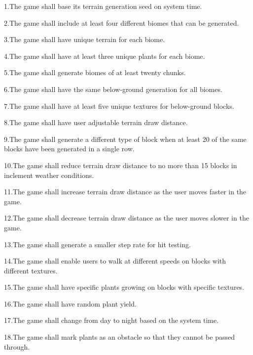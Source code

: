 \label{Requirements_R1}%
\hypertarget{Requirements_R1}{}%
1.\+The game shall base its terrain generation seed on system time.

\label{Requirements_R2}%
\hypertarget{Requirements_R2}{}%
2.\+The game shall include at least four different biomes that can be generated.

\label{Requirements_R3}%
\hypertarget{Requirements_R3}{}%
3.\+The game shall have unique terrain for each biome.

\label{Requirements_R4}%
\hypertarget{Requirements_R4}{}%
4.\+The game shall have at least three unique plants for each biome.

\label{Requirements_R5}%
\hypertarget{Requirements_R5}{}%
5.\+The game shall generate biomes of at least twenty chunks.

\label{Requirements_R6}%
\hypertarget{Requirements_R6}{}%
6.\+The game shall have the same below-\/ground generation for all biomes.

\label{Requirements_R7}%
\hypertarget{Requirements_R7}{}%
7.\+The game shall have at least five unique textures for below-\/ground blocks.

\label{Requirements_R8}%
\hypertarget{Requirements_R8}{}%
8.\+The game shall have user adjustable terrain draw distance.

\label{Requirements_R9}%
\hypertarget{Requirements_R9}{}%
9.\+The game shall generate a different type of block when at least 20 of the same blocks have been generated in a single row.

\label{Requirements_R10}%
\hypertarget{Requirements_R10}{}%
10.\+The game shall reduce terrain draw distance to no more than 15 blocks in inclement weather conditions.

\label{Requirements_R11}%
\hypertarget{Requirements_R11}{}%
11.\+The game shall increase terrain draw distance as the user moves faster in the game.

\label{Requirements_R12}%
\hypertarget{Requirements_R12}{}%
12.\+The game shall decrease terrain draw distance as the user moves slower in the game.

\label{Requirements_R13}%
\hypertarget{Requirements_R13}{}%
13.\+The game shall generate a smaller step rate for hit testing.

\label{Requirements_R14}%
\hypertarget{Requirements_R14}{}%
14.\+The game shall enable users to walk at different speeds on blocks with different textures.

\label{Requirements_R15}%
\hypertarget{Requirements_R15}{}%
15.\+The game shall have specific plants growing on blocks with specific textures.

\label{Requirements_R16}%
\hypertarget{Requirements_R16}{}%
16.\+The game shall have random plant yield.

\label{Requirements_R17}%
\hypertarget{Requirements_R17}{}%
17.\+The game shall change from day to night based on the system time.

\label{Requirements_R18}%
\hypertarget{Requirements_R18}{}%
18.\+The game shall mark plants as an obstacle so that they cannot be passed through. 